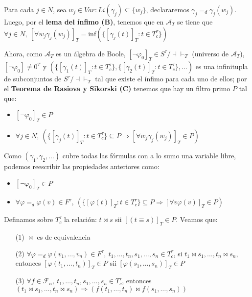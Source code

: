 \documentclass{article}
\begin{document}
Para cada $j\in N$, sea $w_j\in Var:Li(\gamma_j)\subseteq\{w_j\}$, declararemos $\gamma_j=_d\gamma_j(w_j)$. Luego, por el \textbf{lema del ínfimo (B)}, tenemos que en $\mathcal{A}_T$ se tiene que $\forall j\in N,\ [\forall w_j\gamma_j(w_j)]_T=\text{inf}(\{[\gamma_j(t)]_T:t\in T^\tau_c\})$

Ahora, como $\mathcal{A}_T$ es un álgebra de Boole, $[\neg\varphi_0]_T\in S^\tau/\dashv\vdash_T$ (universo de $\mathcal{A}_T$), $[\neg\varphi_0]\neq 0^T$ y $(\{[\gamma_1(t)]_T:t\in T^\tau_c\},\{[\gamma_2(t)]_T:t\in T^\tau_c\},\dots)$ es una infinitupla de subconjuntos de $S^\tau/\dashv\vdash_T$ tal que existe el ínfimo para cada uno de ellos; por el \textbf{Teorema de Rasiova y Sikorski (C)} tenemos que hay un filtro primo $P$ tal que:
\begin{itemize}
  \item $[\neg\varphi_0]_T\in P$
  \item $\forall j\in N,\ (\{[\gamma_j(t)]_T:t\in T^\tau_c\}\subseteq P\Rightarrow [\forall w_j\gamma_j(w_j)]_T\in P)$
\end{itemize}

Como $(\gamma_1,\gamma_2,\dots)$ cubre todas las fórmulas con a lo sumo una variable libre, podemos reescribir las propiedades anteriores como:
\begin{itemize}
  \item $[\neg\varphi_0]_T\in P$
  \item $\forall \varphi=_d\varphi(v)\in F^\tau,\ (\{[\varphi(t)]_T:t\in T^\tau_c\}\subseteq P\Rightarrow [\forall v\varphi(v)]_T\in P)$
\end{itemize}

\vspace{0.3cm}
Definamos sobre $T^\tau_c$ la relación: $t\bowtie s$ sii $[(t\equiv s)]_T\in P$. Veamos que:
\begin{itemize}
  \item[(1)] $\bowtie$ es de equivalencia
  \item[(2)] $\forall\varphi=_d\varphi(v_1,\dots,v_n)\in F^\tau,\ t_1,\dots,t_n,s_1,\dots,s_n\in T^\tau_c$, si $t_1\bowtie s_1,\dots,t_n\bowtie s_n$, entonces $[\varphi(t_1,\dots,t_n)]_T\in P$ sii $[\varphi(s_1,\dots,s_n)]_T\in P$
  \item[(3)] $\forall f\in\mathcal{F}_n,\ t_1,\dots,t_n,s_1,\dots,s_n\in T^\tau_c$, entonces $(t_1\bowtie s_1,\dots,t_n\bowtie s_n)\Rightarrow(f(t_1,\dots,t_n)\bowtie f(s_1,\dots,s_n))$
\end{itemize}
\end{document}
